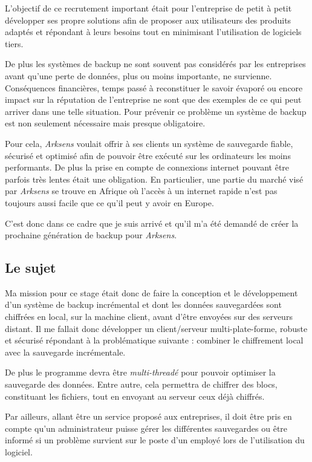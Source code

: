 \documentclass[a4paper,10pt, twoside]{report}
\begin{document}
\begin{spacing}{1.2}
L'objectif de ce recrutement important \'etait pour l'entreprise de petit \`a
petit d\'evelopper ses propre solutions afin de proposer aux utilisateurs des
produits adapt\'es et r\'epondant \`a leurs besoins tout en minimisant
l'utilisation de logiciels tiers.

De plus les syst\`emes de backup ne sont souvent pas consid\'er\'es par les
entreprises avant qu'une perte de donn\'ees, plus ou moins importante,
ne survienne. Cons\'equences financi\`eres, temps pass\'e \`a reconstituer le
savoir \'evapor\'e ou encore impact sur la r\'eputation de l'entreprise ne sont
que des exemples de ce qui peut arriver dans une telle situation. Pour
pr\'evenir ce probl\`eme un syst\`eme de backup est non seulement n\'ecessaire
mais presque obligatoire.

Pour cela, \textit{Arksens} voulait offrir \`a ses clients un syst\`eme de
sauvegarde fiable, s\'ecuris\'e et optimis\'e afin de pouvoir \^etre
ex\'ecut\'e sur les ordinateurs les moins performants. De plus la prise en
compte de connexions internet pouvant \^etre parfois tr\`es lentes \'etait une
obligation. En particulier, une partie du march\'e vis\'e par \textit{Arksens}
se trouve en Afrique o\`u l'acc\`es \`a un internet rapide n'est pas toujours
aussi facile que ce qu'il peut y avoir en Europe.

C'est donc dans ce cadre que je suis arriv\'e et qu'il m'a \'et\'e demand\'e
de cr\'eer la prochaine g\'en\'eration de backup pour \textit{Arksens}.

\subsection{Le sujet}
Ma mission pour ce stage \'etait donc de faire la conception et le
d\'eveloppement d'un syst\`eme de backup incr\'emental et dont les donn\'ees
sauvegard\'ees sont chiffr\'ees en local, sur la machine client, avant d'\^etre
envoy\'ees sur des serveurs distant. Il me fallait donc d\'evelopper un
client/serveur multi-plate-forme, robuste et s\'ecuris\'e r\'epondant \`a
la probl\'ematique suivante : combiner le chiffrement local avec la sauvegarde
incr\'ementale.

De plus le programme devra \^etre \textit{multi-thread\'e} pour pouvoir
optimiser la sauvegarde des donn\'ees. Entre autre, cela permettra de chiffrer
des blocs, constituant les fichiers, tout en envoyant au serveur ceux d\'ej\`a
chiffr\'es.

Par ailleurs, allant \^etre un service propos\'e aux entreprises, il doit \^etre
pris en compte qu'un administrateur puisse g\'erer les diff\'erentes
sauvegardes ou \^etre inform\'e si un probl\`eme survient sur le poste d'un
employ\'e lors de l'utilisation du logiciel.


\end{spacing}
\end{document}
